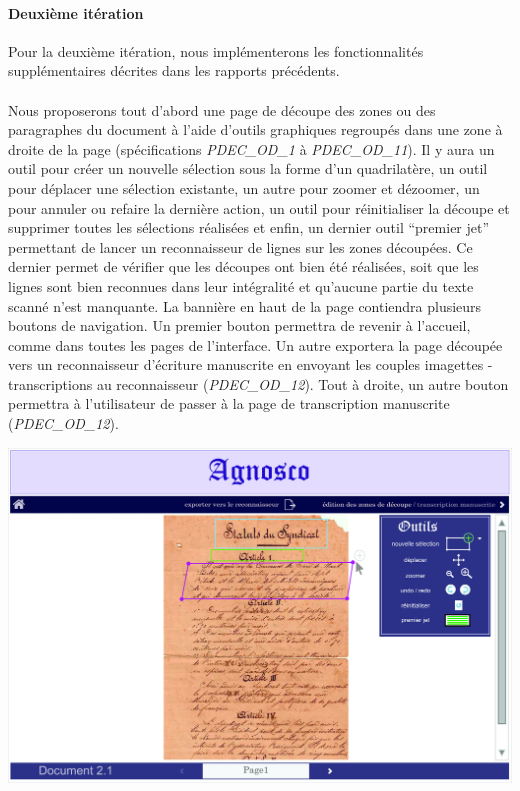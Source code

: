 \newpage{}

\paragraph{Deuxième itération}
Pour la deuxième itération, nous implémenterons les fonctionnalités supplémentaires décrites dans les rapports précédents.

\paragraph{}
Nous proposerons tout d’abord une page de découpe des zones ou des paragraphes du document à l’aide d’outils graphiques regroupés dans une zone à droite de la page (spécifications \textit{PDEC\_OD\_1} à \textit{PDEC\_OD\_11}). Il y aura un outil pour créer un nouvelle sélection sous la forme d’un quadrilatère, un outil pour déplacer une sélection existante, un autre pour zoomer et dézoomer, un pour annuler ou refaire la dernière action, un outil pour réinitialiser la découpe et supprimer toutes les sélections réalisées et enfin, un dernier outil “premier jet” permettant de lancer un reconnaisseur de lignes sur les zones découpées. Ce dernier permet de vérifier que les découpes ont bien été réalisées, soit que les lignes sont bien reconnues dans leur intégralité et qu'aucune partie du texte scanné n’est manquante.
\newline{}
La bannière en haut de la page contiendra plusieurs boutons de navigation. Un premier bouton permettra de revenir à l’accueil, comme dans toutes les pages de l’interface. Un autre exportera la page découpée vers un reconnaisseur d’écriture manuscrite en envoyant les couples imagettes - transcriptions au reconnaisseur (\textit{PDEC\_OD\_12}). Tout à droite, un autre bouton permettra à l’utilisateur de passer à la page de transcription manuscrite (\textit{PDEC\_OD\_12}).

\begin{mdframed}[frametitle={Figure 3 : Maquette de la page de découpe des zones}, innerbottommargin=10]
\begin{center}
\includegraphics[scale=0.04]{assets/maquetteIHMdecoupes.jpg}
\end{center}
\end{mdframed}

